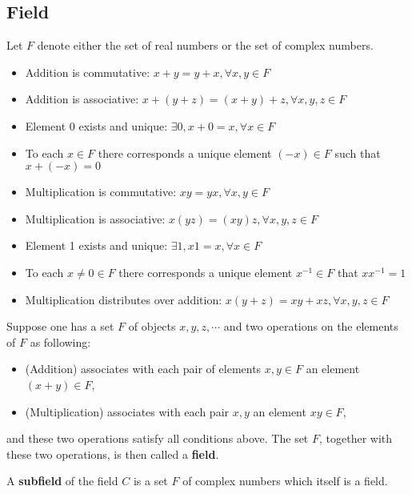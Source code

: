 				\subsection{Field}
					\begin{definition}[Field]
						Let $F$ denote either the set  of real numbers or the set of complex numbers.
						\begin{itemize}
							\item Addition is commutative: $x + y = y + x, \forall x, y \in F$
							\item Addition is associative: $x + (y + z) = (x + y) + z, \forall x, y, z \in F$
							\item Element 0 exists and unique: $\exists 0, x + 0 = x, \forall x \in F$
							\item To each $x \in F$ there corresponds a unique element $(-x) \in F$ such that $x + (-x) = 0$
							\item Multiplication is commutative: $xy = yx, \forall x, y \in F$
							\item Multiplication is associative: $x(yz) = (xy)z, \forall x, y, z \in F$
							\item Element 1 exists and unique: $\exists 1, x1=x, \forall x \in F$
							\item To each $x\neq 0 \in F$ there corresponds a unique element $x^{-1} \in F$ that $xx^{-1} = 1$
							\item Multiplication distributes over addition: $x(y + z) = xy + xz, \forall x, y, z \in F$
						\end{itemize}
						Suppose one has a set $F$ of objects $x, y, z, \cdots$ and two operations on the elements of $F$ as following:
						\begin{itemize}
						 	\item (Addition) associates with each pair of elements $x, y \in F$ an element $(x + y)\in F$,
						 	\item (Multiplication) associates with each pair $x, y$ an element $xy \in F$,
						\end{itemize}
						and these two operations satisfy all conditions above. The set $F$, together with these two operations, is then called a \textbf{field}.
					\end{definition}

					\begin{definition}[Subfield]
						A \textbf{subfield} of the field $C$ is a set $F$ of complex numbers which itself is a field.
					\end{definition}

